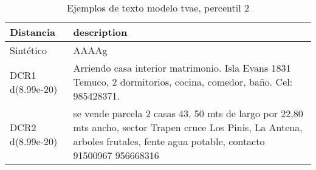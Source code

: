 \begin{table}[H]
\centering
\fontsize{10}{14}\selectfont
\caption{Ejemplos de texto modelo tvae, percentil 2}
\label{table-example-economicos-b-1-tvae-2p-text}
\begin{tabular}{|l|m{35em}|}
\hline
\rowcolor[gray]{0.8}
Distancia & description \\
\hline Sintético & AAAAg \\
\hline DCR1 d(8.99e-20) & Arriendo casa interior matrimonio. Isla Evans 1831 Temuco, 2 dormitorios, cocina, comedor, ba\~no. Cel: 985428371. \\
\hline DCR2 d(8.99e-20) & se vende parcela 2 casas 43, 50 mts de largo por 22,80 mts ancho, sector Trapen cruce Los Pinis, La Antena, arboles frutales, fente agua potable, contacto 91500967 956668316 \\
\hline
\end{tabular}
\end{table}
